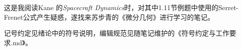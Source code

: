 这是我阅读Kane 的\textit{Spacecraft Dynamics}时，对其中1.11节例题中使用的Serret-Frenet公式产生疑惑，遂找来苏步青的《微分几何》进行学习的笔记。

记号约定见绪论中的符号说明，编辑规范见随笔记维护的《符号约定与工作要求.md》。
